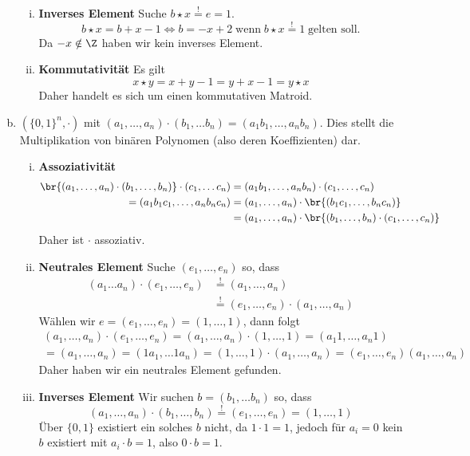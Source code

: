\begin{enumerate}[a)]
\begin{enumerate}[i)]
      \item \textbf{Inverses Element}
        Suche $ b \star x \overset{!}{=} e = 1 $.
        \[
          b \star x = b + x - 1 \iff b = -x + 2 \; \text{wenn} \; b \star x \overset{!}{=} 1 \; \text{gelten soll.}
        \]
        Da $-x \notin \Z$ haben wir kein inverses Element.
      \item \textbf{Kommutativität}
        Es gilt
        \[
          x \star y = x + y - 1 = y + x - 1 = y \star x
        \]
        Daher handelt es sich um einen kommutativen Matroid.
    \end{enumerate}

    \item $  (\{  0,1 \}^{n}, \cdot ) $ mit $  (a_1 , \ldots, a_n) \cdot (b_1, \ldots b_n) = (a_1 b_1, \ldots, a_n b_n) $. Dies stellt die Multiplikation von binären Polynomen (also deren Koeffizienten) dar.
      \begin{enumerate}[i)]
      \item \textbf{Assoziativität}
        \begin{align*}
          \br{ (a_1, \ldots, a_n)\cdot (b_1, \ldots, b_n) } \cdot (c_1, \ldots c_n)
          &= (a_1 b_1 , \ldots, a_n b_n) \cdot (c_1, \ldots, c_n)\\
          = (a_1 b_1 c_1, \ldots , a_n b_n c_n)
          &= (a_1, \ldots, a_n) \cdot \br{ (b_1 c_1 , \ldots, b_n c_n) } \\
          &= (a_1, \ldots, a_n) \cdot \br{ (b_1, \ldots, b_n) \cdot (c_1, \ldots, c_n) }
        \end{align*}
        Daher ist $\cdot$ assoziativ.

      \item \textbf{Neutrales Element}
        Suche $  (e_1, \ldots, e_n) $ so, dass
        \begin{align*}
          (a_1 \ldots a_n) \cdot (e_1, \ldots, e_n) &\overset{!}{=} (a_1, \ldots, a_n) \\
                  &\overset{!}{=} (e_1, \ldots, e_n) \cdot (a_1, \ldots, a_n)
        \end{align*}
        Wählen wir $e = (e_1, \ldots, e_n) = (1, \ldots, 1)$, dann folgt
        \begin{align*}
          (a_1, \ldots, a_n) \cdot (e_1, \ldots, e_n) = (a_1, \ldots, a_n) \cdot (1, \ldots, 1) = (a_1 1 , \ldots , a_n 1)\\ = (a_1, \ldots, a_n) = (1 a_1 , \ldots 1 a_n)
           = (1, \ldots, 1) \cdot (a_1, \ldots, a_n) = (e_1, \ldots, e_n) (a_1, \ldots, a_n)
        \end{align*}
        Daher haben wir ein neutrales Element gefunden.
      \item \textbf{Inverses Element}
        Wir suchen $  b = (b_1, \ldots b_n) $ so, dass
        \[
          (a_1, \ldots, a_n) \cdot (b_1, \ldots, b_n) \overset{!}{=} (e_1, \ldots, e_n) = (1, \ldots, 1)
        \]
        Über $ \{0,1\} $ existiert ein solches $b$ nicht, da $1 \cdot 1 = 1$, jedoch für $a_i = 0$ kein $b$ existiert mit $a_i \cdot b = 1$, also $0 \cdot b = 1$.


\end{enumerate}
\end{enumerate}
